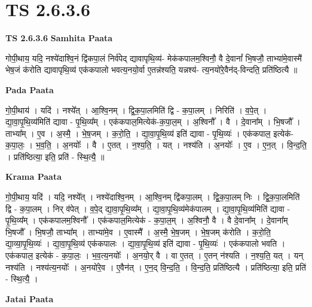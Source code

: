 \documentclass[17pt]{extarticle}
\begin{document}
\section{ TS 2.6.3.6 }

\textbf{TS 2.6.3.6 } \newline
\textbf{Samhita Paata} \newline

गोपी॒थाय॒ यदि॒ नश्ये॑दाश्वि॒नं द्वि॑कपा॒लं निर्व॑पेद् द्यावापृथि॒व्य॑- मेक॑कपालम॒श्विनौ॒ वै दे॒वानां᳚ भि॒षजौ॒ ताभ्या॑मे॒वास्मै॑ भेष॒जं क॑रोति द्यावापृथि॒व्य॑ एक॑कपालो भवत्य॒नयो॒र्वा ए॒तन्न॑श्यति॒ यन्नश्य॑- त्य॒नयो॑रे॒वैन॑द्-विन्दति॒ प्रति॑ष्ठित्यै ॥ \newline

\textbf{Pada Paata} \newline

गो॒पी॒थाय॑ । यदि॑ । नश्ये᳚त् । आ॒श्वि॒नम् । द्वि॒क॒पा॒लमिति॑ द्वि - क॒पा॒लम् । निरिति॑ । व॒पे॒त् । द्या॒वा॒पृ॒थि॒व्य॑मिति॑ द्यावा - पृ॒थि॒व्य᳚म् । एक॑कपाल॒मित्येक॑-क॒पा॒ल॒म् । अ॒श्विनौ᳚ । वै । दे॒वाना᳚म् । भि॒षजौ᳚ । ताभ्या᳚म् । ए॒व । अ॒स्मै॒ । भे॒ष॒जम् । क॒रो॒ति॒ । द्या॒वा॒पृ॒थि॒व्य॑ इति॑ द्यावा - पृ॒थि॒व्यः॑ । एक॑कपाल॒ इत्येक॑-क॒पा॒लः॒ । भ॒व॒ति॒ । अ॒नयोः᳚ । वै । ए॒तत् । न॒श्य॒ति॒ । यत् । नश्य॑ति । अ॒नयोः᳚ । ए॒व । ए॒न॒त् । वि॒न्द॒ति॒ । प्रति॑ष्ठित्या॒ इति॒ प्रति॑ - स्थि॒त्यै॒ ॥  \newline


\textbf{Krama Paata} \newline

गो॒पी॒थाय॒ यदि॑ । यदि॒ नश्ये᳚त् । नश्ये॑दाश्वि॒नम् । आ॒श्वि॒नम् द्वि॑कपा॒लम् । द्वि॒क॒पा॒लम् निः । द्वि॒क॒पा॒लमिति॑ द्वि - क॒पा॒लम् । निर् व॑पेत् । व॒पे॒द् द्या॒वा॒पृ॒थि॒व्य᳚म् । द्या॒वा॒पृ॒थि॒व्य॑मेक॑पालम् । द्या॒वा॒पृ॒थि॒व्य॑मिति॑ द्यावा - पृ॒थि॒व्य᳚म् । एक॑कपालम॒श्विनौ᳚ । एक॑कपाल॒मित्येक॑ - क॒पा॒ल॒म् । अ॒श्विनौ॒ वै । वै दे॒वाना᳚म् । दे॒वाना᳚म् भि॒षजौ᳚ । भि॒षजौ॒ ताभ्या᳚म् । ताभ्या॑मे॒व । ए॒वास्मै᳚ । अ॒स्मै॒ भे॒ष॒जम् । भे॒ष॒जम् क॑रोति । क॒रो॒ति॒ द्या॒व्या॒पृ॒थि॒व्यः॑ । द्या॒वा॒पृ॒थि॒व्य॑ एक॑कपालः । द्या॒वा॒पृ॒थि॒व्य॑ इति॑ द्यावा - पृ॒थि॒व्यः॑ । एक॑कपालो भवति । एक॑कपाल॒ इत्येक॑ - क॒पा॒लः॒ । भ॒व॒त्य॒नयोः᳚ । अ॒नयो॒र् वै । वा ए॒तत् । ए॒तन् न॑श्यति । न॒श्य॒ति॒ यत् । यन् नश्य॑ति । नश्य॑त्य॒नयोः᳚ । अ॒नयो॑रे॒व । ए॒वैन॑त् । ए॒न॒द् वि॒न्द॒ति॒ । वि॒न्द॒ति॒ प्रति॑ष्ठित्यै । प्रति॑ष्ठित्या॒ इति॒ प्रति॑ - स्थि॒त्यै॒ । \newline

\textbf{Jatai Paata} \newline
\end{document}
